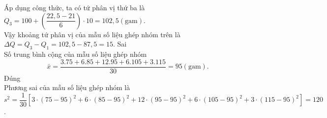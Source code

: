 \begin{ex}
{\begin{itemchoice}
			Áp dụng công thức, ta có tứ phân vị thứ ba là $Q_3=100+\left(\dfrac{22{,}5-21}{6}\right) \cdot 10=102{,}5(\mathrm{gam})$.\\
			Vậy khoảng tứ phân vị của mẫu số liệu ghép nhóm trên là $\Delta Q=Q_3-Q_1=102{,}5-87{,}5=15$.	
			\itemch Sai\\
			Số trung bình cộng của mẫu số liệu ghép nhóm
			$$
			\bar{x}=\dfrac{3.75+6.85+12.95+6.105+3.115}{30}=95(\mathrm{gam}).
			$$
			\itemch Đúng\\
			Phương sai của mẫu số liệu ghép nhóm là
			$$
			s^2=\dfrac{1}{30}\left[3 \cdot(75-95)^2+6 \cdot(85-95)^2+12 \cdot(95-95)^2+6 \cdot(105-95)^2+3 \cdot(115-95)^2\right]=120
			$$.
		\end{itemchoice}
	}
\end{ex}


